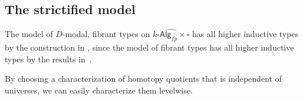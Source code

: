 \documentclass[10pt,a4paper]{article}
\newcommand{\Alg}{\mathsf{Alg}}
\DeclareMathOperator\id{id}
\newcommand\R{\mathsf{R}}
\begin{document}

\subsection{The strictified model}

The model of $D$-modal, fibrant types on $\widehat{k\text{-}\Alg_{fp} \times \square}$ has all higher inductive types by the construction in \cite{CRS21}, since the model of fibrant types has all higher inductive types by the results in~\cite{CoquandHM18}.




By choosing a characterization of homotopy quotients that is independent of universes, we can easily characterize them levelwise.
\end{document}
